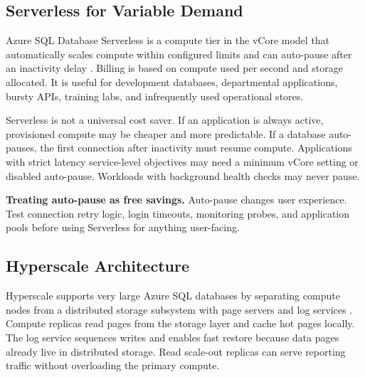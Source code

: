 \subsection{Serverless for Variable Demand}
Azure SQL Database Serverless is a compute tier in the vCore model that automatically scales compute within configured limits and can auto-pause after an inactivity delay \cite{microsoft2025sqlServerless}. Billing is based on compute used per second and storage allocated. It is useful for development databases, departmental applications, bursty APIs, training labs, and infrequently used operational stores.

Serverless is not a universal cost saver. If an application is always active, provisioned compute may be cheaper and more predictable. If a database auto-pauses, the first connection after inactivity must resume compute. Applications with strict latency service-level objectives may need a minimum vCore setting or disabled auto-pause. Workloads with background health checks may never pause.

\begin{pitfall}
\textbf{Treating auto-pause as free savings.} Auto-pause changes user experience. Test connection retry logic, login timeouts, monitoring probes, and application pools before using Serverless for anything user-facing.
\end{pitfall}

\subsection{Hyperscale Architecture}
Hyperscale supports very large Azure SQL databases by separating compute nodes from a distributed storage subsystem with page servers and log services \cite{microsoft2025sqlHyperscale}. Compute replicas read pages from the storage layer and cache hot pages locally. The log service sequences writes and enables fast restore because data pages already live in distributed storage. Read scale-out replicas can serve reporting traffic without overloading the primary compute.

